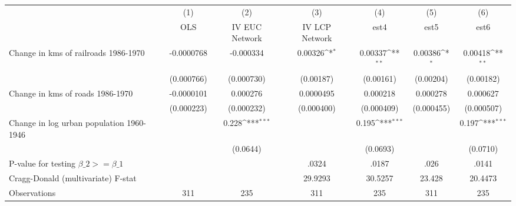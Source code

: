 {
\def\sym#1{\ifmmode^{#1}\else\(^{#1}\)\fi}
\begin{tabular}{l*{6}{c}}
\hline\hline
                &\multicolumn{1}{c}{(1)}&\multicolumn{1}{c}{(2)}&\multicolumn{1}{c}{(3)}&\multicolumn{1}{c}{(4)}&\multicolumn{1}{c}{(5)}&\multicolumn{1}{c}{(6)}\\
                &\multicolumn{1}{c}{OLS}&\multicolumn{1}{c}{IV EUC Network}&\multicolumn{1}{c}{IV LCP Network}&\multicolumn{1}{c}{est4}&\multicolumn{1}{c}{est5}&\multicolumn{1}{c}{est6}\\
\hline
Change in kms of railroads 1986-1970&-0.0000768         &-0.000334         &  0.00326\sym{*}  &  0.00337\sym{**} &  0.00386\sym{*}  &  0.00418\sym{**} \\
                &(0.000766)         &(0.000730)         &(0.00187)         &(0.00161)         &(0.00204)         &(0.00182)         \\
[1em]
Change in kms of roads 1986-1970&-0.0000101         & 0.000276         &0.0000495         & 0.000218         & 0.000278         & 0.000627         \\
                &(0.000223)         &(0.000232)         &(0.000400)         &(0.000409)         &(0.000455)         &(0.000507)         \\
[1em]
Change in log urban population 1960-1946&                  &    0.228\sym{***}&                  &    0.195\sym{***}&                  &    0.197\sym{***}\\
                &                  & (0.0644)         &                  & (0.0693)         &                  & (0.0710)         \\
\hline
P-value for testing $\beta\_{2} >= \beta\_{1}$&                  &                  &    .0324         &    .0187         &     .026         &    .0141         \\
Cragg-Donald (multivariate) F-stat&                  &                  &  29.9293         &  30.5257         &   23.428         &  20.4473         \\
Observations    &      311         &      235         &      311         &      235         &      311         &      235         \\
\hline\hline
\end{tabular}
}
